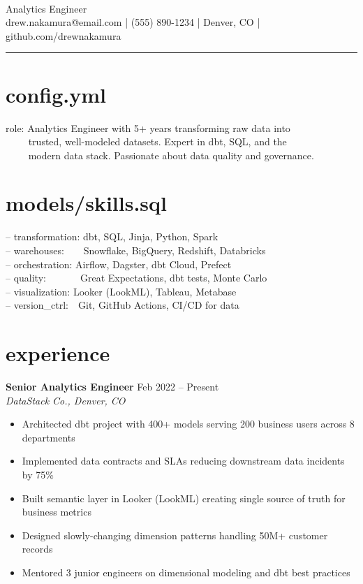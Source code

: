 \documentclass[11pt,a4paper]{article}
\newcommand{\codeblock}[1]{\par\noindent\colorbox{codebg}{\parbox{\dimexpr\textwidth-2\fboxsep}{\ttfamily\small #1}}\par\vspace{0.3em}}
\begin{document}
\\[0.2em]
{\large Analytics Engineer}\\[0.3em]
{\small\ttfamily drew.nakamura@email.com | (555) 890-1234 | Denver, CO | github.com/drewnakamura}

\vspace{0.3em}
\noindent\textcolor{accent}{\rule{\textwidth}{1pt}}

\section{config.yml}
\codeblock{%
\textcolor{accent}{role:} Analytics Engineer with 5+ years transforming raw data into\\
\textcolor{accent}{\ \ \ \ } trusted, well-modeled datasets. Expert in dbt, SQL, and the\\
\textcolor{accent}{\ \ \ \ } modern data stack. Passionate about data quality and governance.}

\section{models/skills.sql}
\codeblock{%
\textcolor{accent}{-- transformation:} dbt, SQL, Jinja, Python, Spark\\
\textcolor{accent}{-- warehouses:}\ \ \ \ Snowflake, BigQuery, Redshift, Databricks\\
\textcolor{accent}{-- orchestration:} Airflow, Dagster, dbt Cloud, Prefect\\
\textcolor{accent}{-- quality:}\ \ \ \ \ \ \ Great Expectations, dbt tests, Monte Carlo\\
\textcolor{accent}{-- visualization:} Looker (LookML), Tableau, Metabase\\
\textcolor{accent}{-- version\_ctrl:}\ \ Git, GitHub Actions, CI/CD for data}

\section{experience}

\noindent\textbf{Senior Analytics Engineer} \hfill \textcolor{accent}{Feb 2022 -- Present}\\
\textit{DataStack Co., Denver, CO}
\begin{itemize}[leftmargin=1.2em,nosep,label={\textcolor{accent}{\texttt{>}}}]
\item Architected dbt project with 400+ models serving 200 business users across 8 departments
\item Implemented data contracts and SLAs reducing downstream data incidents by 75\%
\item Built semantic layer in Looker (LookML) creating single source of truth for business metrics
\item Designed slowly-changing dimension patterns handling 50M+ customer records
\item Mentored 3 junior engineers on dimensional modeling and dbt best practices
\end{itemize}
\vspace{0.5em}
\end{document}
